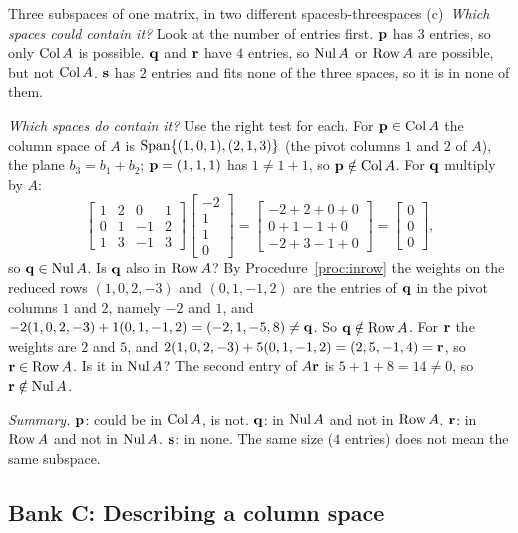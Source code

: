 \documentclass[11pt]{article}
\begin{document}
\begin{exmp}{Three subspaces of one matrix, in two different spaces}{b-threespaces}
(c)~\emph{Which spaces could contain it?} Look at the number of entries first. $\mathbf{p}$ has $3$ entries, so only $\operatorname{Col} A$ is possible. $\mathbf{q}$ and $\mathbf{r}$ have $4$ entries, so $\operatorname{Nul} A$ or $\operatorname{Row} A$ are possible, but not $\operatorname{Col} A$. $\mathbf{s}$ has $2$ entries and fits none of the three spaces, so it is in none of them.

\emph{Which spaces do contain it?} Use the right test for each. For $\mathbf{p}\in\operatorname{Col} A$ the column space of $A$ is $\operatorname{Span}\{(1,0,1),(2,1,3)\}$ (the pivot columns $1$ and $2$ of $A$), the plane $b_3=b_1+b_2$; $\mathbf{p}=(1,1,1)$ has $1\neq1+1$, so $\mathbf{p}\notin\operatorname{Col} A$. For $\mathbf{q}$ multiply by $A$:
\[
\begin{bmatrix}1&2&0&1\\0&1&-1&2\\1&3&-1&3\end{bmatrix}\begin{bmatrix}-2\\1\\1\\0\end{bmatrix}=\begin{bmatrix}-2+2+0+0\\0+1-1+0\\-2+3-1+0\end{bmatrix}=\begin{bmatrix}0\\0\\0\end{bmatrix},
\]
so $\mathbf{q}\in\operatorname{Nul} A$. Is $\mathbf{q}$ also in $\operatorname{Row} A$? By Procedure~\ref{proc:inrow} the weights on the reduced rows $(1,0,2,-3)$ and $(0,1,-1,2)$ are the entries of $\mathbf{q}$ in the pivot columns $1$ and $2$, namely $-2$ and $1$, and $-2(1,0,2,-3)+1(0,1,-1,2)=(-2,1,-5,8)\neq\mathbf{q}$. So $\mathbf{q}\notin\operatorname{Row} A$. For $\mathbf{r}$ the weights are $2$ and $5$, and $2(1,0,2,-3)+5(0,1,-1,2)=(2,5,-1,4)=\mathbf{r}$, so $\mathbf{r}\in\operatorname{Row} A$. Is it in $\operatorname{Nul} A$? The second entry of $A\mathbf{r}$ is $5+1+8=14\neq0$, so $\mathbf{r}\notin\operatorname{Nul} A$.

\emph{Summary.} $\mathbf{p}$: could be in $\operatorname{Col} A$, is not. $\mathbf{q}$: in $\operatorname{Nul} A$ and not in $\operatorname{Row} A$. $\mathbf{r}$: in $\operatorname{Row} A$ and not in $\operatorname{Nul} A$. $\mathbf{s}$: in none. The same size ($4$ entries) does not mean the same subspace.
\end{exmp}

\subsection*{Bank C: Describing a column space}
\end{document}
